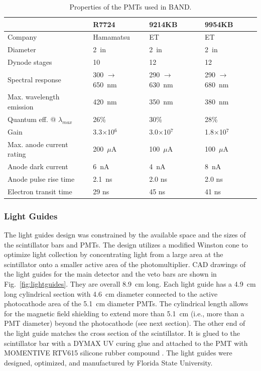 \documentclass[3p,final,twocolumn]{elsarticle}
\begin{document}
\begin{table}[tbh]
\caption{Properties of the PMTs used in BAND. }
\centering
\begin{tabular} { l  l  l l } \hline
 &  R7724 \cite{pmtR7724} & 9214KB \cite{pmt9214}& 9954KB \cite{pmt9954} \\ \hline\hline
Company                                  & Hamamatsu       & ET           & ET \\
Diameter                                           & 2~in                         & 2~in                        & 2~in \\ 
Dynode stages                                  & 10                           & 12                              & 12 \\
Spectral response                            & 300 $\to$ 650~nm & 290 $\to$ 630~nm & 290 $\to$ 680~nm \\ 
Max. wavelength emission               & 420~nm & 350~nm & 380~nm \\ 
Quantum eff. @ $\lambda_{max}$   & 26\% & 30\% & 28\% \\ 
Gain                                                    & 3.3$\times$10$^6$ & 3.0$\times$10$^7$ & 1.8$\times$10$^7$ \\ 
Max. anode current rating               & 200~$\mu$A & 100~$\mu$A & 100~$\mu$A \\ 
Anode dark current                         & 6~nA  & 4~nA & 8~nA \\ 
Anode pulse rise time                      & 2.1~ns & 2.0 ns & 2.0 ns \\ 
Electron transit time                        & 29 ns & 45 ns & 41 ns \\
\hline
\end{tabular}
\label{tab:pmts}
\end{table}

\subsubsection{Light Guides \label{LightGuide}}


The light guides design was constrained by the available space and the sizes of the scintillator bars and PMTs.  The design utilizes a modified Winston
cone to optimize light collection by concentrating light from a large area at the scintillator onto a smaller active area of the photomultiplier.  
CAD drawings of the light guides for the main detector and the veto bars are shown in Fig.~\ref{fig:lightguides}.  They are overall 8.9~\si{\centi\meter} long.  Each light guide has a 4.9~\si{\centi\meter} long cylindrical section with 4.6~\si{\centi\meter} diameter connected to the active photocathode area of the 5.1~\si{\centi\meter} diameter PMTs.  The cylindrical length allows for the magnetic field shielding to extend more than 5.1~\si{\centi\meter} (i.e., more than a PMT diameter) beyond the photocathode (see next section). The other end of the light guide matches the cross section of the scintillator.  It is glued to the scintillator bar with a DYMAX UV curing glue \cite{uvglue} and attached to the PMT with MOMENTIVE RTV615 silicone rubber compound \cite{softglue}. The light guides were designed, optimized, and manufactured by Florida State University.
\end{document}
